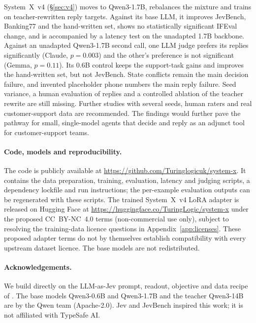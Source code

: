 \documentclass[11pt]{article}
\newcommand{\sysfour}{System~X~v4}
\begin{document}
\sysfour{} (\S\ref{sec:v4}) moves to Qwen3-1.7B, rebalances the mixture and trains on teacher-rewritten reply targets. Against its base LLM, it improves JevBench, Banking77 and the hand-written set, shows no statistically significant IFEval change, and is accompanied by a latency test on the unadapted 1.7B backbone. Against an unadapted Qwen3-1.7B second call, one LLM judge prefers its replies significantly (Claude, $p=0.003$) and the other's preference is not significant (Gemma, $p=0.11$). Its 0.6B control keeps the support-task gains and improves the hand-written set, but not JevBench. State conflicts remain the main decision failure, and invented placeholder phone numbers the main reply failure. Seed variance, a human evaluation of replies and a controlled ablation of the teacher rewrite are still missing. Further studies with several seeds, human raters and real customer-support data are recommended. The findings would further pave the pathway for small, single-model agents that decide and reply as an adjunct tool for customer-support teams.

\paragraph{Code, models and reproducibility.} The code is publicly available at \url{https://github.com/Turinglogicuk/system-x}. It contains the data preparation, training, evaluation, latency and judging scripts, a dependency lockfile and run instructions; the per-example evaluation outputs can be regenerated with these scripts. The trained \sysfour{} LoRA adapter is released on Hugging Face at \url{https://huggingface.co/TuringLogic/system-x} under the proposed CC~BY-NC~4.0 terms (non-commercial use only), subject to resolving the training-data licence questions in Appendix~\ref{app:licenses}. These proposed adapter terms do not by themselves establish compatibility with every upstream dataset licence. The base models are not redistributed.

\paragraph{Acknowledgements.} We build directly on the LLM-as-Jev prompt, readout, objective and data recipe of \citet{li2026llmasjev}. The base models Qwen3-0.6B and Qwen3-1.7B and the teacher Qwen3-14B are by the Qwen team (Apache-2.0). Jev and JevBench inspired this work; it is not affiliated with TypeSafe AI.



\end{document}
